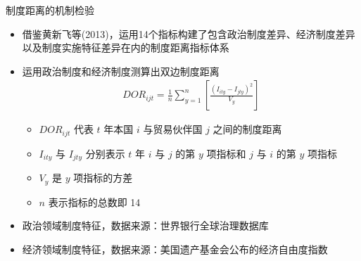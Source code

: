 \documentclass{beamer}
\begin{document}
\begin{frame}{制度距离的机制检验}
    \begin{itemize}
        \item 借鉴黄新飞等(2013)，运用14个指标构建了包含政治制度差异、经济制度差异以及制度实施特征差异在内的制度距离指标体系
        \item 运用政治制度和经济制度测算出双边制度距离
        \begin{gather*}
            DOR_{ijt}=\frac{1}{n} \sum_{y=1}^{n} [\frac{(I_{ity}-I_{jty})^2}{V_y}] \tag{17}
        \end{gather*}
        \begin{itemize}
            \item $DOR_{ijt}$ 代表 $t$ 年本国 $i$ 与贸易伙伴国 $j$ 之间的制度距离
            \item $I_{ity}$ 与 $I_{jty}$ 分别表示 $t$ 年 $i$ 与 $j$ 的第 $y$ 项指标和 $j$ 与 $i$ 的第 $y$ 项指标
            \item $V_y$ 是 $y$ 项指标的方差
            \item $n$ 表示指标的总数即 14
        \end{itemize}
        \item 政治领域制度特征，数据来源：世界银行全球治理数据库
        \item 经济领域制度特征，数据来源：美国遗产基金会公布的经济自由度指数
    \end{itemize}
\end{frame}
\end{document}
